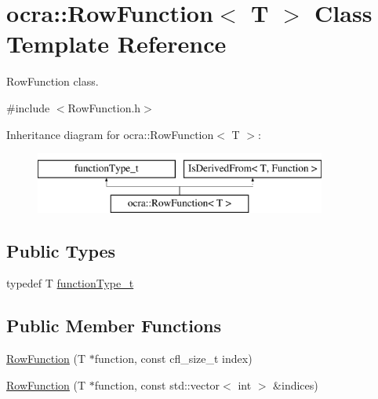 \hypertarget{classocra_1_1RowFunction}{}\section{ocra\+:\+:Row\+Function$<$ T $>$ Class Template Reference}
\label{classocra_1_1RowFunction}


Row\+Function class.  




{\ttfamily \#include $<$Row\+Function.\+h$>$}

Inheritance diagram for ocra\+:\+:Row\+Function$<$ T $>$\+:\begin{figure}[H]
\begin{center}
\leavevmode
\includegraphics[height=2.000000cm]{df/d7f/classocra_1_1RowFunction}
\end{center}
\end{figure}
\subsection*{Public Types}
\begin{DoxyCompactItemize}
\item 
typedef T \hyperlink{classocra_1_1RowFunction_a4b6faf57022f367fdcff681c2dc98306}{function\+Type\+\_\+t}
\end{DoxyCompactItemize}
\subsection*{Public Member Functions}
\begin{DoxyCompactItemize}
\item 
\hyperlink{classocra_1_1RowFunction_aed18ba241ac62a2c8013593f424b60d5}{Row\+Function} (T $\ast$function, const cfl\+\_\+size\+\_\+t index)
\item 
\hyperlink{classocra_1_1RowFunction_a19b2063d4ec61b91fdd8793321414f7d}{Row\+Function} (T $\ast$function, const std\+::vector$<$ int $>$ \&indices)
\end{DoxyCompactItemize}
